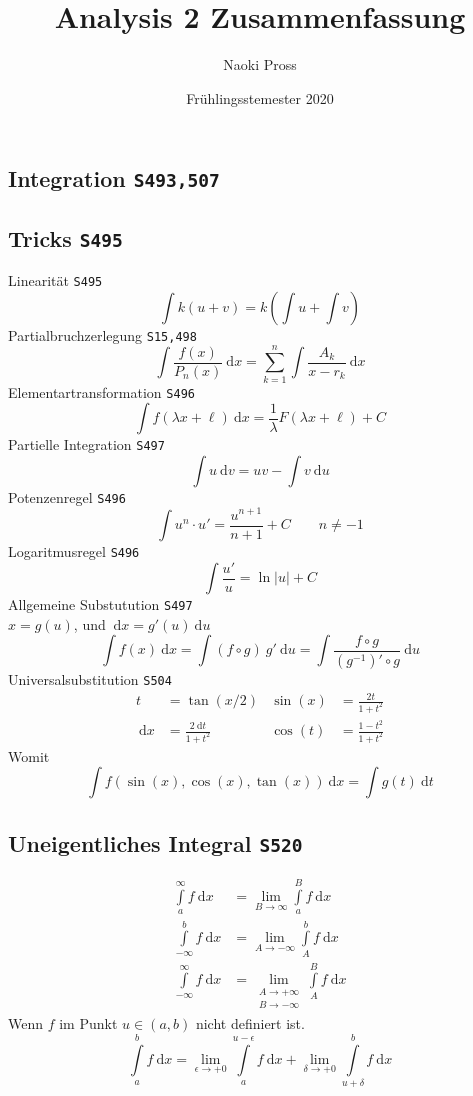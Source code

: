 \documentclass[a4paper]{article}
\title{Analysis 2 Zusammenfassung}
\author{Naoki Pross}
\date{Fr\"uhlingsstemester 2020}
\numberwithin{equation}{subsection}
\newcommand{\dd}[1]{\ensuremath{~\mathrm{d}#1}}
\newcommand{\brpage}[1]{\textcolor{red!70!black}{\small\texttt{S#1}}}
\begin{document}
\begin{multicols}{2}
\section{Integration \brpage{493,507}}
\subsection{Tricks \brpage{495}}
Linearit\"at \brpage{495}
\[
	\int k(u + v) = k\left(\int u + \int v\right)
\]
Partialbruchzerlegung \brpage{15,498}
\[
	\int \frac{f(x)}{P_n(x)} \dd{x} = \sum_{k=1}^n \int \frac{A_k}{x-r_k}\dd{x}
\]
Elementartransformation \brpage{496}
\[
	\int f(\lambda x + \ell) \dd{x} = \frac{1}{\lambda} F(\lambda x + \ell) + C
\]
Partielle Integration \brpage{497}
\[
	\int u \dd{v} = uv - \int v \dd{u}
\]
Potenzenregel \brpage{496}
\[
	\int u^n \cdot u' = \frac{u^{n+1}}{n+1} + C \qquad n \neq -1
\]
Logaritmusregel \brpage{496}
\[
	\int \frac{u'}{u} = \ln|u| + C
\]
Allgemeine Substutution \brpage{497}\\
 \(x = g(u)\), und \(\dd{x} = g'(u)\dd{u}\)
\[
	\int f(x) \dd{x} = \int (f\circ g) ~ g' \dd{u} = \int \frac{f \circ g}{(g^{-1})'\circ g} \dd{u} 
\]
Universalsubstitution \brpage{504}
\begin{align*}
	t &= \tan(x/2) & \sin(x) &= \frac{2t}{1+t^2} \\
	\dd{x} &= \frac{2\dd{t}}{1+t^2} & \cos(t) &= \frac{1-t^2}{1+t^2} 
\end{align*}
Womit
\[
	\int f(\sin(x), \cos(x), \tan(x)) \dd{x} = \int g(t) \dd{t}
\]

\subsection{Uneigentliches Integral \brpage{520}}
\begin{align*}
	\int\limits_a^\infty f \dd{x} &= \lim_{B \to \infty} \int\limits_a^B f \dd{x} \\
	\int\limits_{-\infty}^b f \dd{x} &= \lim_{A \to -\infty} \int\limits_A^b f \dd{x} \\
	\int\limits_{-\infty}^\infty f \dd{x} &= \lim_{\substack{A \to +\infty \\ B \to -\infty}} \int\limits_A^B f \dd{x}
\end{align*}
Wenn \(f\) im Punkt \(u \in (a,b)\) nicht definiert ist.
\begin{equation} \label{eqn:int-with-pole}
	\int\limits_a^b f \dd{x} = 
	\lim_{\epsilon\to +0} \int\limits_a^{u-\epsilon} f \dd{x}
	+ \lim_{\delta\to +0} \int\limits_{u+\delta}^b f \dd{x}
\end{equation}


\end{multicols}
\end{document}
